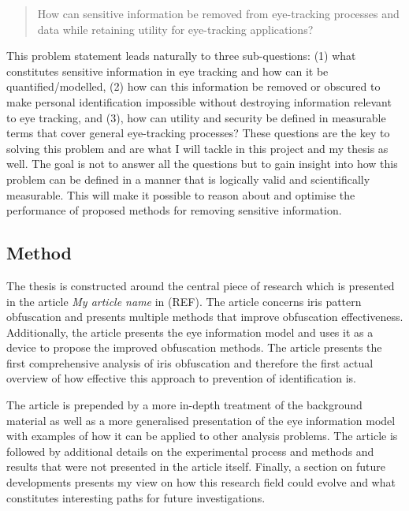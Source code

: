 \begin{quotation}
How can sensitive information be removed from eye-tracking processes and data while retaining utility for eye-tracking applications?
\end{quotation}

This problem statement leads naturally to three sub-questions: (1) what constitutes sensitive information in eye tracking and how can it be quantified/modelled, (2) how can this information be removed or obscured to make personal identification impossible without destroying information relevant to eye tracking, and (3), how can utility and security be defined in measurable terms that cover general eye-tracking processes? These questions are the key to solving this problem and are what I will tackle in this project and my thesis as well. The goal is not to answer all the questions but to gain insight into how this problem can be defined in a manner that is logically valid and scientifically measurable. This will make it possible to reason about and optimise the performance of proposed methods for removing sensitive information. 

\subsection{Method}
The thesis is constructed around the central piece of research which is presented in the article \emph{My article name} in (REF). The article concerns iris pattern obfuscation and presents multiple methods that improve obfuscation effectiveness. Additionally, the article presents the eye information model and uses it as a device to propose the improved obfuscation methods. The article presents the first comprehensive analysis of iris obfuscation and therefore the first actual overview of how effective this approach to prevention of identification is.

The article is prepended by a more in-depth treatment of the background material as well as a more generalised presentation of the eye information model with examples of how it can be applied to other analysis problems. The article is followed by additional details on the experimental process and methods and results that were not presented in the article itself. Finally, a section on future developments presents my view on how this research field could evolve and what constitutes interesting paths for future investigations.